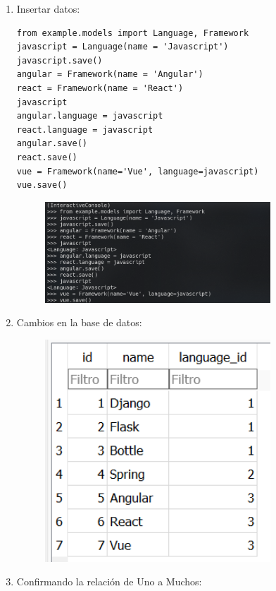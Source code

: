 \documentclass{article}
\begin{document}
\begin{enumerate}
  \item Insertar datos:
\begin{lstlisting}
from example.models import Language, Framework
javascript = Language(name = 'Javascript')
javascript.save()
angular = Framework(name = 'Angular')
react = Framework(name = 'React')
javascript
angular.language = javascript
react.language = javascript
angular.save()
react.save()
vue = Framework(name='Vue', language=javascript)
vue.save()
\end{lstlisting}
\begin{figure}[H]
		\centering
		\includegraphics[width=0.8\textwidth,keepaspectratio]{img/Ejercicio1/2.png}
	\end{figure}
  \item Cambios en la base de datos:
\begin{figure}[H]
		\centering
		\includegraphics[width=0.8\textwidth,keepaspectratio]{img/Ejercicio1/3.png}
	\end{figure}
  \item Confirmando la relación de Uno a Muchos:


\end{enumerate}
\end{document}
